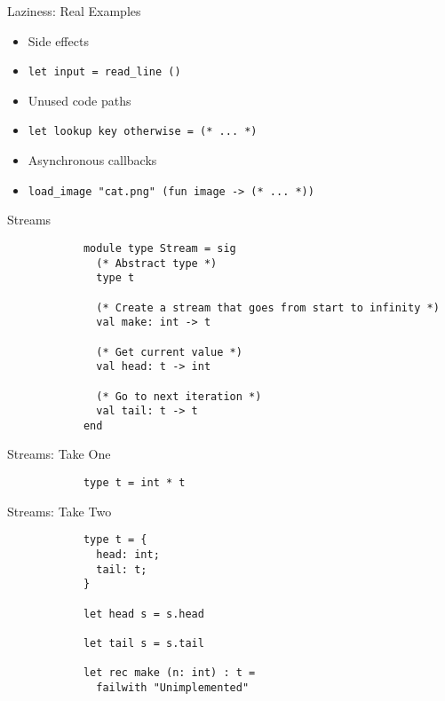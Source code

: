 \documentclass{beamer}
\newcommand{\code}[1]{\texttt{#1}}
\begin{document}
    \begin{frame}{Laziness: Real Examples}
        \begin{itemize}
            \item<1-> Side effects
            \item<2-> \code{let input = read_line ()}
            \item<3-> Unused code paths
            \item<4-> \code{let lookup key otherwise = (* ... *)}
            \item<5-> Asynchronous callbacks
            \item<6-> \code{load_image "cat.png" (fun image -> (* ... *))}
        \end{itemize}
    \end{frame}

    \begin{frame}[fragile=singleslide]{Streams}
        \begin{verbatim}
            module type Stream = sig
              (* Abstract type *)
              type t

              (* Create a stream that goes from start to infinity *)
              val make: int -> t

              (* Get current value *)
              val head: t -> int
                
              (* Go to next iteration *)
              val tail: t -> t
            end
        \end{verbatim}
    \end{frame}

    \begin{frame}[fragile=singleslide]{Streams: Take One}
        \begin{verbatim}
            type t = int * t
        \end{verbatim}
    \end{frame}

    \begin{frame}[fragile=singleslide]{Streams: Take Two}
        \begin{verbatim}
            type t = {
              head: int;
              tail: t;
            }

            let head s = s.head

            let tail s = s.tail

            let rec make (n: int) : t =
              failwith "Unimplemented"
        \end{verbatim}
    \end{frame}
\end{document}
